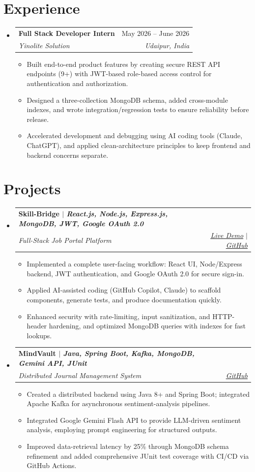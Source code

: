 \documentclass[letterpaper,12pt]{article}
\makeatletter
\newcommand{\resumeItem}[1]{
  \item{
    {#1 \vspace{-2.5pt}}
  }
}
\newcommand{\resumeSubheading}[4]{
  \vspace{-2pt}\item
    \begin{tabular*}{0.98\textwidth}[t]{l@{\extracolsep{\fill}}r}
      \textbf{#1} & #2 \\
      \textit{#3} & \textit{#4} \\
    \end{tabular*}\vspace{-6pt}
}
\newcommand{\resumeSubHeadingListStart}{\begin{itemize}[leftmargin=0.15in, label={}]}
\newcommand{\resumeSubHeadingListEnd}{\end{itemize}}
\newcommand{\resumeItemListStart}{\begin{itemize}}
\newcommand{\resumeItemListEnd}{\end{itemize}\vspace{-6pt}}
\makeatother
\begin{document}
\section{Experience}
  \resumeSubHeadingListStart
    \resumeSubheading
      {Full Stack Developer Intern}{May 2026 -- June 2026}
      {Yinolite Solution}{Udaipur, India}
      \resumeItemListStart
        \resumeItem{Built end-to-end product features by creating secure REST API endpoints (9+) with JWT-based role-based access control for authentication and authorization.}
        \resumeItem{Designed a three-collection MongoDB schema, added cross-module indexes, and wrote integration/regression tests to ensure reliability before release.}
        \resumeItem{Accelerated development and debugging using AI coding tools (Claude, ChatGPT), and applied clean-architecture principles to keep frontend and backend concerns separate.}
      \resumeItemListEnd
  \resumeSubHeadingListEnd

\section{Projects}
    \resumeSubHeadingListStart
      \resumeSubheading
        {\textbf{Skill-Bridge} $|$ \emph{React.js, Node.js, Express.js, MongoDB, JWT, Google OAuth 2.0}}{}
        {Full-Stack Job Portal Platform}{\href{https://job-portal-system-alpha.vercel.app}{\underline{Live Demo}} $|$ \href{https://github.com/Chinmay0608/job-portal-system}{\underline{GitHub}}}
        \resumeItemListStart
          \resumeItem{Implemented a complete user-facing workflow: React UI, Node/Express backend, JWT authentication, and Google OAuth 2.0 for secure sign-in.}
          \resumeItem{Applied AI-assisted coding (GitHub Copilot, Claude) to scaffold components, generate tests, and produce documentation quickly.}
          \resumeItem{Enhanced security with rate-limiting, input sanitization, and HTTP-header hardening, and optimized MongoDB queries with indexes for fast lookups.}
        \resumeItemListEnd

      \resumeSubheading
        {\textbf{MindVault} $|$ \emph{Java, Spring Boot, Kafka, MongoDB, Gemini API, JUnit}}{}
        {Distributed Journal Management System}{\href{https://github.com/Chinmay0608/MindVault}{\underline{GitHub}}}
        \resumeItemListStart
          \resumeItem{Created a distributed backend using Java 8+ and Spring Boot; integrated Apache Kafka for asynchronous sentiment-analysis pipelines.}
          \resumeItem{Integrated Google Gemini Flash API to provide LLM-driven sentiment analysis, employing prompt engineering for structured outputs.}
          \resumeItem{Improved data-retrieval latency by 25\% through MongoDB schema refinement and added comprehensive JUnit test coverage with CI/CD via GitHub Actions.}
        \resumeItemListEnd
    \resumeSubHeadingListEnd
\end{document}
